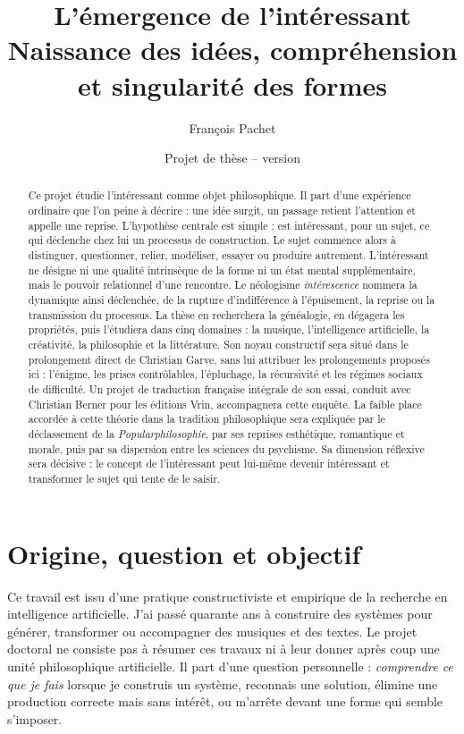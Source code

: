 \documentclass[11pt,a4paper]{article}
\title{L'émergence de l'intéressant\\
\large Naissance des idées, compréhension et singularité des formes}
\author{François Pachet}
\date{Projet de thèse -- version \projectversion\\\small \projectdate}
\begin{document}
\maketitle

\begin{abstract}
Ce projet étudie l'intéressant comme objet philosophique. Il part
d'une expérience ordinaire que l'on peine à décrire : une idée surgit, un
passage retient l'attention et appelle une reprise. L'hypothèse centrale est
simple : est intéressant, pour un sujet, ce qui déclenche chez lui un processus
de construction. Le sujet commence alors à
distinguer, questionner, relier, modéliser, essayer ou produire autrement.
L'intéressant ne désigne ni une qualité intrinsèque de la forme ni un état
mental supplémentaire, mais le pouvoir relationnel d'une rencontre. Le
néologisme \emph{intérescence} nommera la dynamique ainsi déclenchée, de la
rupture d'indifférence à l'épuisement, la reprise ou la transmission du
processus. La thèse en recherchera la généalogie, en dégagera les propriétés,
puis l'étudiera dans cinq domaines : la musique,
l'intelligence artificielle, la créativité, la philosophie et la littérature.
Son noyau constructif sera situé dans le prolongement direct de Christian
Garve, sans lui attribuer les prolongements proposés ici : l'énigme, les prises
contrôlables, l'épluchage, la récursivité et les régimes sociaux de difficulté.
Un projet de traduction française intégrale de son essai, conduit avec
Christian Berner pour les éditions Vrin, accompagnera cette enquête.
La faible place accordée à cette théorie dans la tradition philosophique sera
expliquée par le déclassement de la \emph{Popularphilosophie}, par ses reprises
esthétique, romantique et morale, puis par sa dispersion entre les sciences du psychisme.
Sa dimension réflexive sera décisive : le concept de l'intéressant peut
lui-même devenir intéressant et transformer le sujet qui tente de le saisir.
\end{abstract}

\section{Origine, question et objectif}

Ce travail est issu d'une pratique constructiviste et empirique de la recherche
en intelligence artificielle. J'ai passé quarante ans à construire des systèmes
pour générer, transformer ou accompagner des musiques et des textes. Le projet
doctoral ne consiste pas à résumer ces travaux ni à leur donner après coup une
unité philosophique artificielle. Il part d'une question personnelle :
\emph{comprendre ce que je fais} lorsque je construis un système, reconnais une
solution, élimine une production correcte mais sans intérêt, ou m'arrête devant
une forme qui semble s'imposer.
\end{document}

